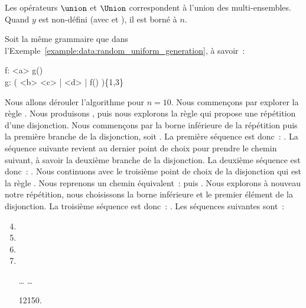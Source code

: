 Les opérateurs $\union$ et $\Union$ correspondent à l'union des multi-ensembles.
Quand $y$ est non-défini (avec \code{*} et \code{+}), il est borné à $n$.

\begin{example}
\label{example:data:bounded_exhaustive_generation}

Soit la même grammaire que dans
l'Exemple~\ref{example:data:random_uniform_generation}, à savoir~:

\begin{pre}
f: <a> g() \\
g: ( <b> <c> | <d> | f() )\{1,3\}
\end{pre}

Nous allons dérouler l'algorithme pour $n = 10$. Nous commençons par explorer la
règle . Nous produisons , puis nous explorons la règle
 qui propose une répétition d'une disjonction.  Nous commençons par la
borne inférieure de la répétition puis la première branche de la disjonction,
soit . La première séquence est donc~: . La
séquence suivante revient au dernier point de choix pour prendre le chemin
suivant, à savoir la deuxième branche de la disjonction. La deuxième séquence
est donc~: . Nous continuons avec le troisième point de choix de
la disjonction qui est la règle . Nous reprenons un chemin équivalent~:
 puis . Nous explorons à nouveau notre répétition, nous
choisissons la borne inférieure et le premier élément de la disjonction. La
troisième séquence est donc~: . Les séquences suivantes
sont~:

\begin{enumerate}
\setcounter{enumi}{3}

\item {}

\item {}

\item {}

\item {}

\item[…] …

\item[12150.] 

\end{enumerate}

\end{example}

